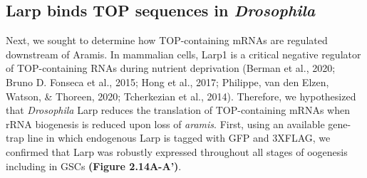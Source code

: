 \documentclass[12pt,oneside]{reedthesis}
\begin{document}
\textbf{\hfill\break
}

\hypertarget{larp-binds-top-sequences-in-drosophila}{%
\subsection{\texorpdfstring{Larp binds TOP sequences in \emph{Drosophila}}{Larp binds TOP sequences in Drosophila}}\label{larp-binds-top-sequences-in-drosophila}}

Next, we sought to determine how TOP-containing mRNAs are regulated downstream of Aramis. In mammalian cells, Larp1 is a critical negative regulator of TOP-containing RNAs during nutrient deprivation (Berman et al., 2020; Bruno D. Fonseca et al., 2015; Hong et al., 2017; Philippe, van den Elzen, Watson, \& Thoreen, 2020; Tcherkezian et al., 2014). Therefore, we hypothesized that \emph{Drosophila} Larp reduces the translation of TOP-containing mRNAs when rRNA biogenesis is reduced upon loss of \emph{aramis}. First, using an available gene-trap line in which endogenous Larp is tagged with GFP and 3XFLAG, we confirmed that Larp was robustly expressed throughout all stages of oogenesis including in GSCs \textbf{(Figure 2.14A-A')}.
\end{document}
